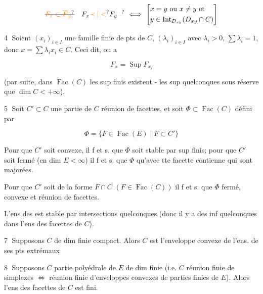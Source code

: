 \[
\deleted{\unsure{F_x\subset\overline F_y}}\quad F_x\unsure{\prec|<} F_y\ \unsure{.}\ \Longleftrightarrow\
\left[\begin{aligned} &x=y\ \text{ou}\ x\ne y\ \text{et}\\
&y\in\operatorname{Int}_{D_{xy}}(D_{xy}\cap C)\end{aligned}\right]
\]


\textcircled{4} Soient $(x_i)_{i\in I}$ une famille finie de pts de $C$, $(\lambda_i)_{i\in I}$ avec $\lambda_i>0$, $\sum\lambda_i=1$, donc $x=\sum\lambda_i x_i\in C$. Ceci dit, on a

\[
 F_x=\operatorname{Sup} F_{x_i}
\]

(par suite, dans $\operatorname{Fac}(C)$ les sup finis existent -  les sup quelconques sous réserve que $\dim C<+\infty$).

\textcircled{5} Soit $C'\subset C$ une partie de $C$ réunion de facettes, et soit $\Phi\subset\operatorname{Fac}(C)$ défini par

\[
 \Phi=\{F\in\operatorname{Fac}(E)\mid F\subset C'\}
\]

Pour que $C'$ soit convexe, il f et s. que $\Phi$ soit stable par sup finis; pour que $C'$ soit   fermé  (en dim $E<\infty$) il f et s. que $\Phi$  qu'avec tte facette  contienne  qui sont majorées.

 Pour que $C'$ soit de la forme $\overline F\cap C$ $(F\in\operatorname{Fac}(C))$ il f et s. que $\Phi$  fermé, convexe et   réunion de facettes.

L'ens des   est stable par intersections quelconques (donc il y a des inf quelconques dans l'ens des facettes de $C$).


\textcircled{7} Supposons $C$ de  dim finie compact. Alors $C$ est l'enveloppe convexe de l'ens. de ses pts extrémaux

\textcircled{8} Supposons $C$ partie polyédrale de $E$ de dim finie (i.e. $C$ réunion finie de simplexes $\Longleftrightarrow$ réunion finie d'enveloppes convexes de parties finies de $E$). Alors l'ens des facettes de $C$ est fini.

